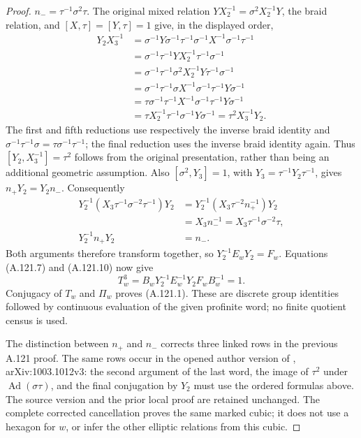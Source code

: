 \begin{proof}
\(n_-=\tau^{-1}\sigma^2\tau\). The original mixed relation
\(YX_2^{-1}=\sigma^2X_2^{-1}Y\), the braid relation, and
\([X,\tau]=[Y,\tau]=1\) give, in the displayed order,
\[
\begin{aligned}
Y_2X_3^{-1}
 &=\sigma^{-1}Y\sigma^{-1}\tau^{-1}
       \sigma^{-1}X^{-1}\sigma^{-1}\tau^{-1}\\
 &=\sigma^{-1}\tau^{-1}Y X_2^{-1}\tau^{-1}\sigma^{-1}\\
 &=\sigma^{-1}\tau^{-1}\sigma^2X_2^{-1}Y
                                  \tau^{-1}\sigma^{-1}\\
 &=\sigma^{-1}\tau^{-1}\sigma X^{-1}\sigma^{-1}
                                  \tau^{-1}Y\sigma^{-1}\\
 &=\tau\sigma^{-1}\tau^{-1}X^{-1}\sigma^{-1}
                                  \tau^{-1}Y\sigma^{-1}\\
 &=\tau X_2^{-1}\tau^{-1}\sigma^{-1}Y\sigma^{-1}
  =\tau^2X_3^{-1}Y_2.
\end{aligned}
\]
The first and fifth reductions use respectively the inverse braid
identity and
\(\sigma^{-1}\tau^{-1}\sigma=\tau\sigma^{-1}\tau^{-1}\);
the final reduction uses the inverse braid identity again.
Thus \([Y_2,X_3^{-1}]=\tau^2\) follows from the original
presentation, rather than being an additional geometric assumption.
Also \([\sigma^2,Y_3]=1\), with
\(Y_3=\tau^{-1}Y_2\tau^{-1}\), gives
\(n_+Y_2=Y_2n_-\). Consequently
\[
\begin{aligned}
Y_2^{-1}(X_3\tau^{-1}\sigma^{-2}\tau^{-1})Y_2
 &=Y_2^{-1}(X_3\tau^{-2}n_+^{-1})Y_2\\
 &=X_3n_-^{-1}=X_3\tau^{-1}\sigma^{-2}\tau,\\
Y_2^{-1}n_+Y_2&=n_-.
\end{aligned}
\]
Both arguments therefore transform together, so
\(Y_2^{-1}E_wY_2=F_w\). Equations (A.121.7) and
(A.121.10) now give
\[
 T_w^3=B_wY_2^{-1}E_w^{-1}Y_2F_wB_w^{-1}=1 .
\]
Conjugacy of \(T_w\) and \(\Pi_w\) proves (A.121.1).
These are discrete group identities followed by continuous evaluation
of the given profinite word; no finite quotient census is used.

The distinction between \(n_+\) and \(n_-\) corrects three
linked rows in the previous A.121 proof. The same rows occur in the
opened author version of \citet[Proposition~2.20(2), pp.~16--17]
{A_Enriquez2014}, arXiv:1003.1012v3: the second argument of the
last word, the image of \(\tau^2\) under
\(\operatorname{Ad}(\sigma\tau)\), and the final conjugation
by \(Y_2\) must use the ordered formulas above. The source
version and the prior local proof are retained unchanged. The
complete corrected cancellation proves the same marked cubic;
it does not use a hexagon for \(w\), or infer the other elliptic
relations from this cubic.


\end{proof}
